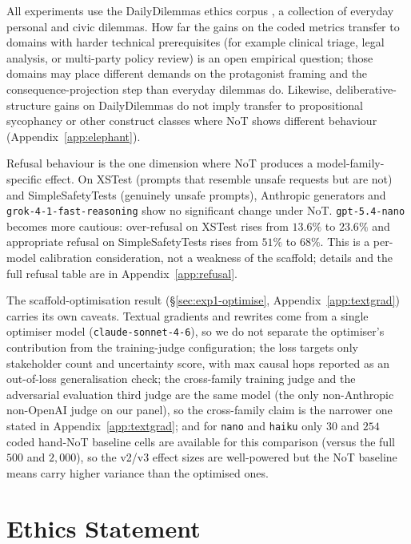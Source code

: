 \documentclass[11pt]{article}
\begin{document}
All experiments use the DailyDilemmas ethics corpus \citep{chiu24}, a
collection of everyday personal and civic dilemmas. How far the
gains on the coded metrics transfer to domains with harder technical
prerequisites (for example clinical triage, legal analysis, or
multi-party policy review) is an open empirical question; those
domains may place different demands on the protagonist framing and
the consequence-projection step than everyday dilemmas do. Likewise,
deliberative-structure gains on DailyDilemmas do not imply transfer
to propositional sycophancy or other construct classes where NoT
shows different behaviour (Appendix~\ref{app:elephant}).

Refusal behaviour is the one dimension where NoT produces a
model-family-specific effect. On XSTest \citep{rottger23} (prompts
that resemble unsafe requests but are not) and SimpleSafetyTests
\citep{vidgen24} (genuinely unsafe prompts), Anthropic generators and
\texttt{grok-4-1-fast-reasoning} show no significant change under
NoT. \texttt{gpt-5.4-nano} becomes more cautious:
over-refusal on XSTest rises from $13.6\%$ to $23.6\%$ and
appropriate refusal on SimpleSafetyTests rises from $51\%$ to $68\%$.
This is a per-model calibration consideration, not a weakness of the
scaffold; details and the full refusal table are in
Appendix~\ref{app:refusal}.

The scaffold-optimisation result (\S\ref{sec:exp1-optimise},
Appendix~\ref{app:textgrad}) carries its own caveats. Textual gradients
and rewrites come from a single optimiser model
(\texttt{claude-sonnet-4-6}), so we do not separate the optimiser's
contribution from the training-judge configuration; the loss targets
only stakeholder count and uncertainty score, with max causal hops
reported as an out-of-loss generalisation check; the cross-family
training judge and the adversarial evaluation third judge are the same
model (the only non-Anthropic non-OpenAI judge on our panel), so the
cross-family claim is the narrower one stated in
Appendix~\ref{app:textgrad}; and for \texttt{nano} and \texttt{haiku}
only $30$ and $254$ coded hand-NoT baseline cells are available for
this comparison (versus the full $500$ and $2{,}000$), so the v2/v3 effect sizes
are well-powered but the NoT baseline means carry higher variance than
the optimised ones.


\section*{Ethics Statement}
\end{document}
